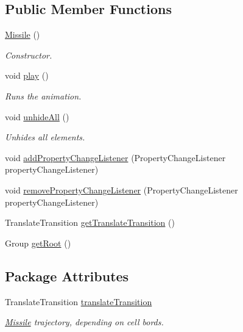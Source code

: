 \subsection*{Public Member Functions}
\begin{DoxyCompactItemize}
\item 
\hyperlink{classbattleship2D_1_1ui_1_1Missile_a80363f27f61ea044ba42fbaf482f75eb}{Missile} ()
\begin{DoxyCompactList}\small\item\em Constructor. \end{DoxyCompactList}\item 
void \hyperlink{classbattleship2D_1_1ui_1_1Missile_a78fee53882ef8470b43bbea98e80d9fa}{play} ()
\begin{DoxyCompactList}\small\item\em Runs the animation. \end{DoxyCompactList}\item 
void \hyperlink{classbattleship2D_1_1ui_1_1Missile_aae01b0649ae2b290f7fa8a638d945ce5}{unhide\-All} ()
\begin{DoxyCompactList}\small\item\em Unhides all elements. \end{DoxyCompactList}\item 
void \hyperlink{classbattleship2D_1_1ui_1_1Missile_a6764a666a4261ed004ea6f055f421e7f}{add\-Property\-Change\-Listener} (Property\-Change\-Listener property\-Change\-Listener)
\item 
void \hyperlink{classbattleship2D_1_1ui_1_1Missile_aafbe9d0e93733b548cf10ce3552159b9}{remove\-Property\-Change\-Listener} (Property\-Change\-Listener property\-Change\-Listener)
\item 
Translate\-Transition \hyperlink{classbattleship2D_1_1ui_1_1Missile_adea76c3a0aee1efe1f1b69c552ab5f58}{get\-Translate\-Transition} ()
\item 
Group \hyperlink{classbattleship2D_1_1ui_1_1Missile_a484050811c16c63bd9e1ad323ddbf367}{get\-Root} ()
\end{DoxyCompactItemize}
\subsection*{Package Attributes}
\begin{DoxyCompactItemize}
\item 
Translate\-Transition \hyperlink{classbattleship2D_1_1ui_1_1Missile_ac23e9803151112d2284c60bf83f4d389}{translate\-Transition}
\begin{DoxyCompactList}\small\item\em \hyperlink{classbattleship2D_1_1ui_1_1Missile}{Missile} trajectory, depending on cell bords. \end{DoxyCompactList}\end{DoxyCompactItemize}
